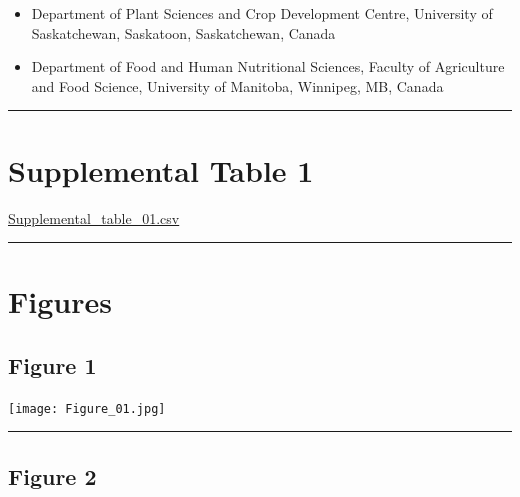 \documentclass[
]{article}
\providecommand{\tightlist}{%
  \setlength{\itemsep}{0pt}\setlength{\parskip}{0pt}}
\begin{document}
\begin{itemize}
\tightlist
\item
  Department of Plant Sciences and Crop Development Centre, University
  of Saskatchewan, Saskatoon, Saskatchewan, Canada
\item
  Department of Food and Human Nutritional Sciences, Faculty of
  Agriculture and Food Science, University of Manitoba, Winnipeg, MB,
  Canada
\end{itemize}

\begin{center}\rule{0.5\linewidth}{0.5pt}\end{center}

\hypertarget{supplemental-table-1}{%
\section{Supplemental Table 1}\label{supplemental-table-1}}

\url{Supplemental_table_01.csv}

\begin{center}\rule{0.5\linewidth}{0.5pt}\end{center}

\hypertarget{figures}{%
\section{Figures}\label{figures}}

\hypertarget{figure-1}{%
\subsection{Figure 1}\label{figure-1}}

\texttt{[image: Figure\_01.jpg]}

\begin{center}\rule{0.5\linewidth}{0.5pt}\end{center}

\hypertarget{figure-2}{%
\subsection{Figure 2}\label{figure-2}}
\end{document}
